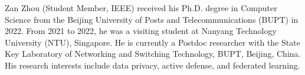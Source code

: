 \documentclass[lettersize,journal]{IEEEtran}
\begin{document}






\newpage


\begin{IEEEbiography}{Zan Zhou} (Student Member, IEEE)
received his Ph.D. degree in Computer Science from the Beijing University of Posts and Telecommunications (BUPT) in 2022. 
From 2021 to 2022, he was a visiting student at Nanyang Technology University (NTU), Singapore. 
He is currently a Postdoc researcher with the State Key Laboratory of Networking and Switching Technology, BUPT, Beijing, China. His research interests include data privacy, active defense, and federated learning. %
\end{IEEEbiography}

\vspace{11pt}
\end{document}
